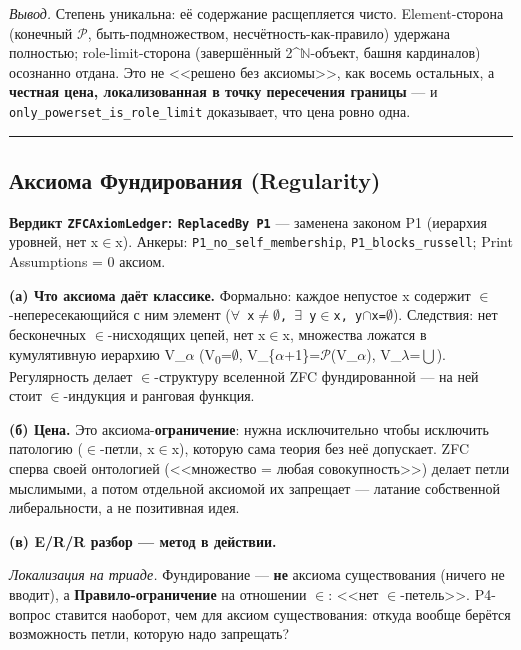 \documentclass[11pt,a4paper]{article}
\begin{document}
\emph{Вывод.} Степень уникальна: её содержание расщепляется чисто. Element-сторона (конечный $\mathcal{P}$, быть-подмножеством, несчётность-как-правило) удержана полностью; role-limit-сторона (завершённый 2\textasciicircum{}$\mathbb{N}$-объект, башня кардиналов) осознанно отдана. Это не <<решено без аксиомы>>, как восемь остальных, а \textbf{честная цена, локализованная в точку пересечения границы} --- и \texttt{only\_\allowbreak{}powerset\_\allowbreak{}is\_\allowbreak{}role\_\allowbreak{}limit} доказывает, что цена ровно одна.

\bigskip\hrule\bigskip

\subsection{Аксиома Фундирования (Regularity)}

\textbf{Вердикт \texttt{ZFCAxiom\allowbreak{}Ledger}: \texttt{Replaced\allowbreak{}By P1}} --- заменена законом P1 (иерархия уровней, нет x$\in$x). Анкеры: \texttt{P1\_\allowbreak{}no\_\allowbreak{}self\_\allowbreak{}membership}, \texttt{P1\_\allowbreak{}blocks\_\allowbreak{}russell}; Print Assumptions = 0 аксиом.

\textbf{(а) Что аксиома даёт классике.} Формально: каждое непустое x содержит $\in$-непересекающийся с ним элемент (\texttt{$\forall$ x$\ne$$\emptyset$,\allowbreak{} $\exists$ y$\in$x,\allowbreak{} y$\cap$x=$\emptyset$}). Следствия: нет бесконечных $\in$-нисходящих цепей, нет x$\in$x, множества ложатся в кумулятивную иерархию V\_$\alpha$ (V\textsubscript{0}=$\emptyset$, V\_\{$\alpha$+1\}=$\mathcal{P}$(V\_$\alpha$), V\_$\lambda$=$\bigcup$). Регулярность делает $\in$-структуру вселенной ZFC фундированной --- на ней стоит $\in$-индукция и ранговая функция.

\textbf{(б) Цена.} Это аксиома-\textbf{ограничение}: нужна исключительно чтобы исключить патологию ($\in$-петли, x$\in$x), которую сама теория без неё допускает. ZFC сперва своей онтологией (<<множество = любая совокупность>>) делает петли мыслимыми, а потом отдельной аксиомой их запрещает --- латание собственной либеральности, а не позитивная идея.

\textbf{(в) E/R/R разбор --- метод в действии.}

\emph{Локализация на триаде.} Фундирование --- \textbf{не} аксиома существования (ничего не вводит), а \textbf{Правило-ограничение} на отношении $\in$: <<нет $\in$-петель>>. P4-вопрос ставится наоборот, чем для аксиом существования: откуда вообще берётся возможность петли, которую надо запрещать?
\end{document}
